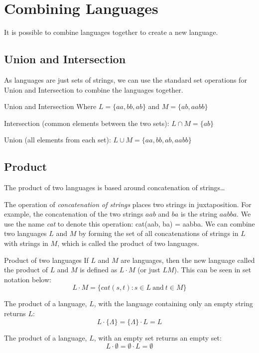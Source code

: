 \section{Combining Languages}
It is possible to combine languages together to create a new language.

\subsection{Union and Intersection}
As languages are just sets of strings, we can use the standard set operations for Union and Intersection to combine the languages together.

\begin{example}{Union and Intersection}
Where $L = \{aa, bb, ab\}$ and $M = \{ab, aabb\}$

Intersection (common elements between the two sets):  $L \cap M = \{ab\}$

Union (all elements from each set): $L \cup M = \{aa, bb, ab, aabb\}$
\end{example}

\subsection{Product}
The product of two languages is based around concatenation of strings\dots

The operation of \textit{concatenation of strings} places two strings in juxtaposition. For example, the concatenation of the two strings $aab$ and $ba$ is the string $aabba$. We use the name \textit{cat} to denote this operation: cat(aab, ba) = aabba. We can combine two languages $L$ and $M$ by forming the set of all concatenations of strings in $L$ with strings in $M$, which is called the product of two languages.

\begin{define}
    \item[Product of two languages] If $L$ and $M$ are languages, then the new language called the product of $L$ and $M$ is defined as $L \cdot M$ (or just $LM$). This can be seen in set notation below:
    \[L \cdot M = \{cat(s, t) : s \in L\ \mathrm{and}\ t \in M\}\]
\end{define}

The product of a language, $L$, with the language containing only an empty string returns $L$:
\[L \cdot \{\Lambda\} = \{\Lambda\} \cdot L = L\]

The product of a language, $L$, with an empty set returns an empty set:
\[L \cdot \emptyset = \emptyset \cdot L = \emptyset\]

